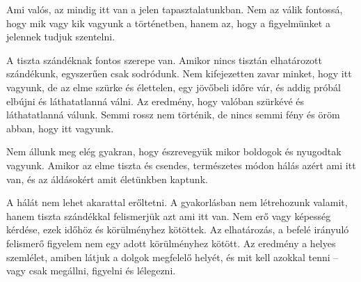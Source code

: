 Ami valós, az mindig itt van a jelen tapasztalatunkban. Nem az válik
fontossá, hogy mik vagy kik vagyunk a történetben, hanem az, hogy a
figyelmünket a jelennek tudjuk szentelni.

\enlargethispage*{\baselineskip}

A tiszta szándéknak fontos szerepe van. Amikor nincs tisztán
elhatározott szándékunk, egyszerűen csak sodródunk. Nem kifejezetten
zavar minket, hogy itt vagyunk, de az elme szürke és élettelen, egy
jövőbeli időre vár, és addig próbál elbújni és láthatatlanná válni. Az
eredmény, hogy valóban szürkévé és láthatatlanná válunk. Semmi rossz nem
történik, de nincs semmi fény és öröm abban, hogy itt vagyunk.

Nem állunk meg elég gyakran, hogy észrevegyük mikor boldogok és
nyugodtak vagyunk. Amikor az elme tiszta és csendes, természetes módon
hálás azért ami itt van, és az áldásokért amit életünkben kaptunk.

A hálát nem lehet akarattal erőltetni. A gyakorlásban nem létrehozunk
valamit, hanem tiszta szándékkal felismerjük azt ami itt van. Nem erő
vagy képesség kérdése, ezek időhöz és körülményhez kötöttek. Az
elhatározás, a befelé irányuló felismerő figyelem nem egy adott
körülményhez kötött. Az eredmény a helyes szemlélet, amiben látjuk a
dolgok megfelelő helyét, és mit kell azokkal tenni -- vagy csak
megállni, figyelni és lélegezni.
